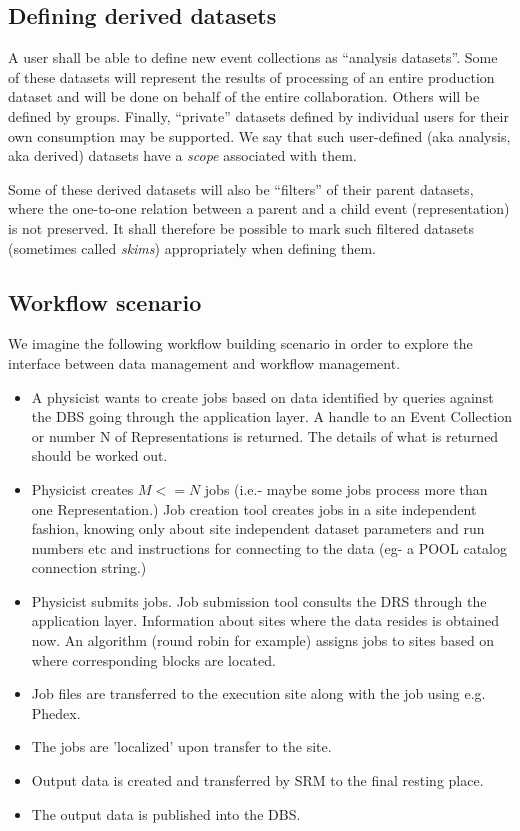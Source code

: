 \documentclass{cmspaper}
\begin{document}
\subsection{Defining derived datasets}

A user shall be able to define new event collections as ``analysis
datasets''. Some of these datasets will represent the results of processing
of an entire production dataset and will be done on behalf of the entire
collaboration. Others will be defined by groups. Finally, ``private''
datasets defined by individual users for their own consumption may be
supported. We say that such user-defined (aka analysis, aka derived)
datasets have a {\em scope} associated with them.

Some of these derived datasets will also be ``filters'' of their parent
datasets, where the one-to-one relation between a parent and a child
event (representation) is not preserved. It shall therefore be possible
to mark such filtered datasets (sometimes called {\em skims}) appropriately
when defining them.
 
\subsection{Workflow scenario}

We imagine the following workflow building scenario in order to explore the 
interface between data management and workflow management.

\begin{itemize}
\item A physicist wants to create jobs based on data identified by queries against 
the DBS going through the application layer.  A handle to an Event Collection or number N of
Representations is returned.  The details of what is returned should be worked out.
\item Physicist creates $M <= N$ jobs (i.e.- maybe some jobs process 
more than one Representation.)  Job 
creation tool creates jobs in a site independent fashion, knowing only about site 
independent dataset parameters and run numbers etc and instructions for connecting to 
the data (eg- a POOL catalog connection string.)
\item Physicist submits jobs.  Job submission tool consults the DRS through the 
application layer.  Information about sites where the data resides is obtained 
now.  An algorithm (round robin for example) assigns jobs to sites based on where 
corresponding blocks are located.
\item Job files are transferred to the execution site along with the job using e.g. Phedex.
\item The jobs are 'localized' upon transfer to the site.
\item Output data is created and transferred by SRM to the final resting place.
\item The output data is published into the DBS.
\end{itemize}
\end{document}
